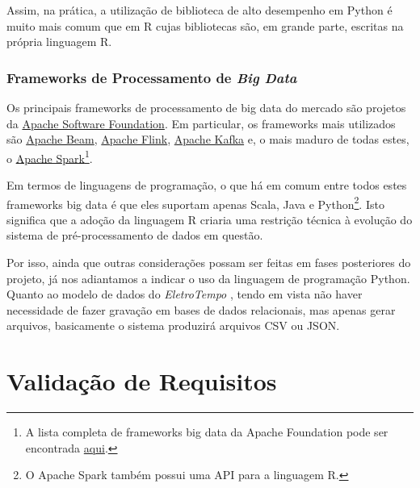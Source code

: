 \documentclass[a4paper, 12pt]{report}
\begin{document}
\begin{doublespace}
Assim, na prática, a utilização de biblioteca de alto desempenho em Python é muito mais comum que em R cujas bibliotecas são, em grande parte, escritas na própria linguagem R.

\subsection{Frameworks de Processamento de \textit{Big Data}} \label{frameworksBigData}

Os principais frameworks de processamento de big data do mercado são projetos da \href{https://www.apache.org/}{Apache Software Foundation}. Em particular, os frameworks mais utilizados são \href{https://projects.apache.org/project.html?beam}{Apache Beam}, \href{https://nightlies.apache.org/flink/flink-docs-master/docs/dev/python/overview/}{Apache Flink}, \href{https://kafka-python.readthedocs.io/en/master/}{Apache Kafka} e, o mais maduro de todas estes, o  \href{https://spark.apache.org/}{Apache Spark}\footnote{A lista completa de frameworks big data da Apache Foundation pode ser encontrada \href{https://projects.apache.org/projects.html?category\#big-data}{aqui}.}.   

Em termos de linguagens de programação, o que há em comum entre todos estes frameworks big data é que eles suportam apenas Scala, Java e Python\footnote{O Apache Spark também possui uma API para a linguagem R.}.  Isto significa que a adoção da linguagem R criaria uma restrição técnica à evolução do sistema de pré-processamento de dados em questão.


Por isso, ainda que outras considerações possam ser feitas em fases posteriores do projeto, já nos adiantamos a indicar o uso da linguagem de programação Python.
Quanto ao modelo de dados do \textit{EletroTempo} \textsuperscript{\textregistered}, tendo em vista não haver necessidade de fazer gravação em bases de dados relacionais, mas apenas gerar arquivos, basicamente o sistema produzirá arquivos CSV ou JSON.


\end{doublespace}


\chapter{Validação de Requisitos}
\end{document}
